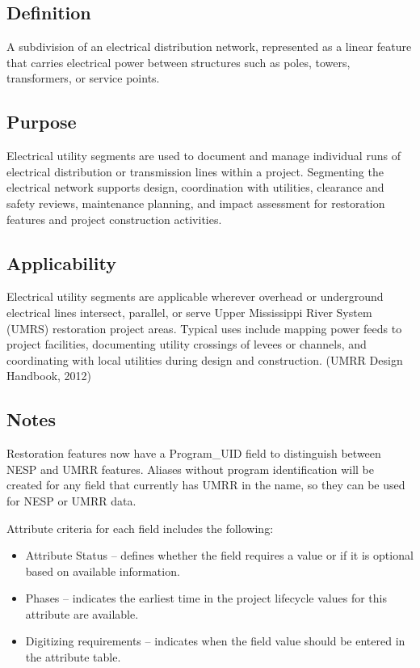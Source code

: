 \documentclass[
  letterpaper,
  DIV=11,
  numbers=noendperiod]{scrreprt}
\providecommand{\tightlist}{%
  \setlength{\itemsep}{0pt}\setlength{\parskip}{0pt}}
\begin{document}
\subsection{Definition}\label{definition-19}

A subdivision of an electrical distribution network, represented as a
linear feature that carries electrical power between structures such as
poles, towers, transformers, or service points.

\subsection{Purpose}\label{purpose-23}

Electrical utility segments are used to document and manage individual
runs of electrical distribution or transmission lines within a project.
Segmenting the electrical network supports design, coordination with
utilities, clearance and safety reviews, maintenance planning, and
impact assessment for restoration features and project construction
activities.

\subsection{Applicability}\label{applicability-20}

Electrical utility segments are applicable wherever overhead or
underground electrical lines intersect, parallel, or serve Upper
Mississippi River System (UMRS) restoration project areas. Typical uses
include mapping power feeds to project facilities, documenting utility
crossings of levees or channels, and coordinating with local utilities
during design and construction. (UMRR Design Handbook, 2012)

\subsection{Notes}\label{notes-23}

Restoration features now have a Program\_UID field to distinguish
between NESP and UMRR features. Aliases without program identification
will be created for any field that currently has UMRR in the name, so
they can be used for NESP or UMRR data.

Attribute criteria for each field includes the following:

\begin{itemize}
\tightlist
\item
  Attribute Status -- defines whether the field requires a value or if
  it is optional based on available information.
\item
  Phases -- indicates the earliest time in the project lifecycle values
  for this attribute are available.
\item
  Digitizing requirements -- indicates when the field value should be
  entered in the attribute table.
\end{itemize}
\end{document}
